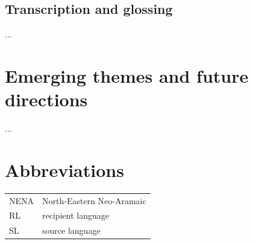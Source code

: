 \documentclass[output=paper]{langsci/langscibook}
\begin{document}
\subsection{Transcription and glossing}
...


\section{Emerging themes and future directions}\label{introthemes}
...

\section*{Abbreviations}

\begin{tabularx}{.5\textwidth}{@{}lQ@{}}
NENA & North-Eastern Neo-Aramaic\\
RL & recipient language\\
SL & source language\\
\end{tabularx}%

\sloppy
\printbibliography[heading=subbibliography,notkeyword=this] 
\end{document}
